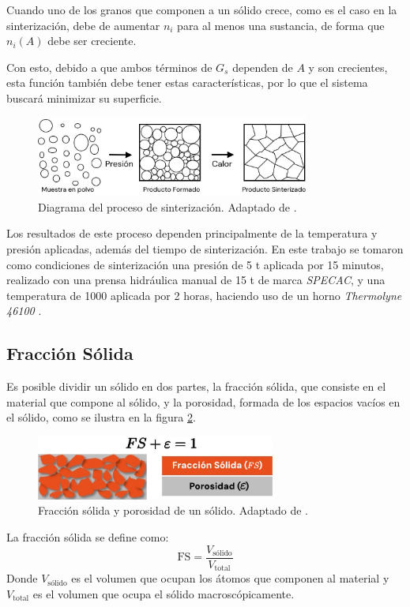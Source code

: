 \documentclass[../main.tex]{subfiles}
\begin{document}
Cuando uno de los granos que componen a un sólido crece, como es el caso en la sinterización, debe de aumentar $n_i$ para al menos una sustancia, de forma que $n_i(A)$ debe ser creciente.

Con esto, debido a que ambos términos de $G_s$ dependen de $A$ y son crecientes, esta función también debe tener estas características, por lo que el sistema buscará minimizar su superficie.
\begin{figure}[H]
    \centering
    \includegraphics[width=0.8\textwidth]{fig/sintdiag.jpg}
    \caption{Diagrama del proceso de sinterización. Adaptado de \cite{Ou2014}.}
    \label{fig:sintdiag}
\end{figure}

Los resultados de este proceso dependen principalmente de la temperatura y presión aplicadas, además del tiempo de sinterización. En este trabajo se tomaron como condiciones de sinterización una presión de 5 t aplicada por 15 minutos, realizado con una prensa hidráulica manual de 15 t de marca \textit{SPECAC}, y una temperatura de 1000\gradoC{} aplicada por 2 horas, haciendo uso de un horno \textit{Thermolyne 46100} \cite{Aparnadevi2016}.

\subsection{Fracción Sólida}
Es posible dividir un sólido en dos partes, la fracción sólida, que consiste en el material que compone al sólido, y la porosidad, formada de los espacios vacíos en el sólido, como se ilustra en la figura \ref{fig:fracsolida}. 
\begin{figure}[H]
    \centering
    \includegraphics[width=0.7\textwidth]{fig/fracsolida.jpg}
    \caption{Fracción sólida y porosidad de un sólido. Adaptado de \cite{Erklaert2024}.}
    \label{fig:fracsolida}
\end{figure}
La fracción sólida se define como:
\begin{equation}
    \text{FS}=\dfrac{V_\text{sólido}}{V_\text{total}}
    \label{eq:fracsolida}
\end{equation}
Donde $V_\text{sólido}$ es el volumen que ocupan los átomos que componen al material y $V_\text{total}$ es el volumen que ocupa el sólido macroscópicamente.
\end{document}
